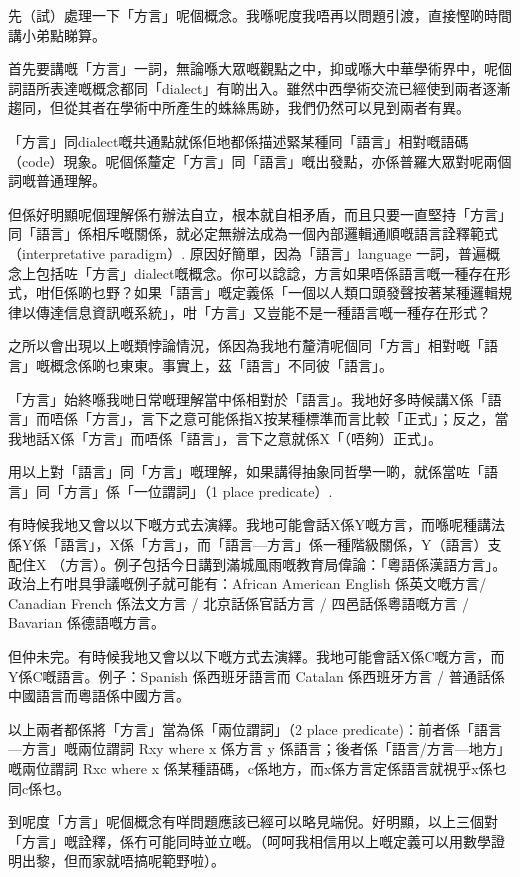 \documentclass[a5paper, 10pt, openany]{book} %
\begin{document}
先（試）處理一下「方言」呢個概念。我喺呢度我唔再以問題引渡，直接慳啲時間講小弟點睇算。

首先要講嘅「方言」一詞，無論喺大眾嘅觀點之中，抑或喺大中華學術界中，呢個詞語所表達嘅概念都同「dialect」有啲出入。雖然中西學術交流已經使到兩者逐漸趨同，但從其者在學術中所產生的蛛絲馬跡，我們仍然可以見到兩者有異。

「方言」同dialect嘅共通點就係佢地都係描述緊某種同「語言」相對嘅語碼（code）現象。呢個係釐定「方言」同「語言」嘅出發點，亦係普羅大眾對呢兩個詞嘅普通理解。

但係好明顯呢個理解係冇辦法自立，根本就自相矛盾，而且只要一直堅持「方言」同「語言」係相斥嘅關係，就必定無辦法成為一個內部邏輯通順嘅語言詮釋範式（interpretative paradigm）. 原因好簡單，因為「語言」language 一詞，普遍概念上包括咗「方言」dialect嘅概念。你可以諗諗，方言如果唔係語言嘅一種存在形式，咁佢係啲乜野？如果「語言」嘅定義係「一個以人類口頭發聲按著某種邏輯規律以傳達信息資訊嘅系統」，咁「方言」又豈能不是一種語言嘅一種存在形式？

之所以會出現以上嘅類悖論情況，係因為我地冇釐清呢個同「方言」相對嘅「語言」嘅概念係啲乜東東。事實上，茲「語言」不同彼「語言」。

「方言」始終喺我哋日常嘅理解當中係相對於「語言」。我地好多時候講X係「語言」而唔係「方言」，言下之意可能係指X按某種標準而言比較「正式」；反之，當我地話X係「方言」而唔係「語言」，言下之意就係X「（唔夠）正式」。

用以上對「語言」同「方言」嘅理解，如果講得抽象同哲學一啲，就係當咗「語言」同「方言」係「一位謂詞」（1 place predicate）.

有時候我地又會以以下嘅方式去演繹。我地可能會話X係Y嘅方言，而喺呢種講法係Y係「語言」，X係「方言」，而「語言—方言」係一種階級關係，Y（語言）支配住X （方言）。例子包括今日講到滿城風雨嘅教育局偉論：「粵語係漢語方言」。政治上冇咁具爭議嘅例子就可能有：African American English 係英文嘅方言/ Canadian French 係法文方言 / 北京話係官話方言 / 四邑話係粵語嘅方言 / Bavarian 係德語嘅方言。

但仲未完。有時候我地又會以以下嘅方式去演繹。我地可能會話X係C嘅方言，而Y係C嘅語言。例子：Spanish 係西班牙語言而 Catalan 係西班牙方言 / 普通話係中國語言而粵語係中國方言。

以上兩者都係將「方言」當為係「兩位謂詞」（2 place predicate)：前者係「語言—方言」嘅兩位謂詞 Rxy where x 係方言 y 係語言；後者係「語言/方言—地方」嘅兩位謂詞 Rxc where x 係某種語碼，c係地方，而x係方言定係語言就視乎x係乜同c係乜。

到呢度「方言」呢個概念有咩問題應該已經可以略見端倪。好明顯，以上三個對「方言」嘅詮釋，係冇可能同時並立嘅。（呵呵我相信用以上嘅定義可以用數學證明出黎，但而家就唔搞呢範野啦）。
\end{document}
